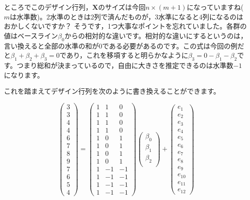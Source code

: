 \documentclass{ltjsbook}
\begin{document}
ところでこのデザイン行列，$\bm{X}$のサイズは今回$n \times (m+1)$になっていますね($m$は水準数)。2水準のときは2列で済んだものが，3水準になると4列になるのはおかしくないですか？
そうです，1つ大事なポイントを忘れていました。各群の値はベースライン$\beta_0$からの相対的な違いです。相対的な違いにするというのは，言い換えると全部の水準の和が$0$である必要があるのです。この式は今回の例だと$\beta_1+\beta_2+\beta_3=0$であり，これを移項すると明らかなように$\beta_3 = 0 - \beta_1 - \beta_2$です。つまり総和が決まっているので，自由に大きさを推定できるのは水準数$-1$になります。

これを踏まえてデザイン行列を次のように書き換えることができます。

\[
	\begin{pmatrix}
		3 \\
		3 \\
		4 \\
		4 \\
		6 \\
		7 \\
		8 \\
		9 \\
		7 \\
		6 \\
		5 \\
		4
	\end{pmatrix}
	=
	\begin{pmatrix}
		1 & 1  & 0  \\
		1 & 1  & 0  \\
		1 & 1  & 0  \\
		1 & 1  & 0  \\
		1 & 0  & 1  \\
		1 & 0  & 1  \\
		1 & 0  & 1  \\
		1 & 0  & 1  \\
		1 & -1 & -1 \\
		1 & -1 & -1 \\
		1 & -1 & -1 \\
		1 & -1 & -1
	\end{pmatrix}
	\begin{pmatrix}
		\beta_0 \\
		\beta_1 \\
		\beta_2 \\
	\end{pmatrix}+
	\begin{pmatrix}
		e_1    \\
		e_2    \\
		e_3    \\
		e_4    \\
		e_5    \\
		e_6    \\
		e_7    \\
		e_8    \\
		e_9    \\
		e_{10} \\
		e_{11} \\
		e_{12}
	\end{pmatrix}
\]
\end{document}
